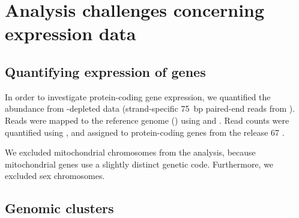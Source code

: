 \chapter{Analysis challenges concerning  expression data}
\label{sec:trna-analysis}

\section{Quantifying expression of \mrna genes}

In order to investigate protein-coding gene expression, we quantified the \mrna
abundance from \rrna-depleted \rnaseq data (strand-specific \SI{75}{bp}
paired-end reads from  ). Reads were mapped to
the \mmu reference genome () using 
\citep{Fonseca:2014} and  \citep{Kim:2013}. Read counts were
quantified using  \citep{Anders:2014}, and assigned to
protein-coding genes from the  release \num{67}
\citep{Flicek:2014}.

We excluded mitochondrial chromosomes from the analysis, because mitochondrial
genes use a slightly distinct genetic code. Furthermore, we excluded
sex chromosomes.

%
%
%

\section{Genomic clusters}

